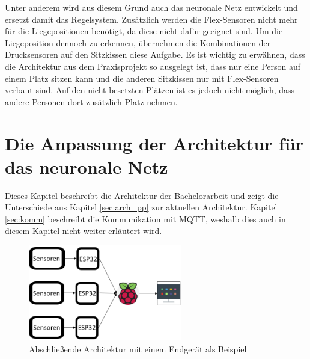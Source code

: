 \newline
Unter anderem wird aus diesem Grund auch das neuronale Netz entwickelt und ersetzt damit das Regelsystem. Zusätzlich werden die Flex-Sensoren nicht mehr für die Liegepositionen benötigt, da diese nicht dafür geeignet sind. Um die Liegeposition dennoch zu erkennen, übernehmen die Kombinationen der Drucksensoren auf den Sitzkissen diese Aufgabe. Es ist wichtig zu erwähnen, dass die Architektur aus dem Praxisprojekt so ausgelegt ist, dass nur eine Person auf einem Platz sitzen kann und die anderen Sitzkissen nur mit Flex-Sensoren verbaut sind. Auf den nicht besetzten Plätzen ist es jedoch nicht möglich, dass andere Personen dort zusätzlich Platz nehmen. 

\section{Die Anpassung der Architektur für das neuronale Netz}
\label{sec:arch_sofa}
Dieses Kapitel beschreibt die Architektur der Bachelorarbeit und zeigt die Unterschiede aus Kapitel \ref{sec:arch_pp} zur aktuellen Architektur. Kapitel \ref{sec:komm} beschreibt die Kommunikation mit MQTT, weshalb dies auch in diesem Kapitel nicht weiter erläutert wird.

\begin{figure}[H]
	\centering
		\includegraphics[width=0.6\textwidth]{images/Architektur.png}
	\caption{Abschließende Architektur mit einem Endgerät als Beispiel}
	\label{fig:arch}
\end{figure}

